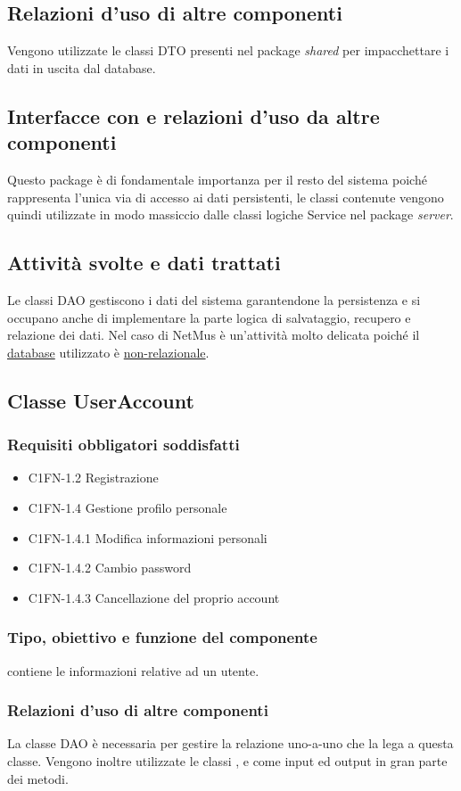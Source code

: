\subsection*{Relazioni d'uso di altre componenti}
Vengono utilizzate le classi DTO presenti nel package \emph{shared} per
impacchettare i dati in uscita dal database. 
\subsection*{Interfacce con e relazioni d'uso da altre componenti}
Questo package \`e di fondamentale importanza per il resto del sistema poich\'e
rappresenta l'unica via di accesso ai dati persistenti, le classi contenute
vengono quindi utilizzate in modo massiccio dalle classi logiche Service nel
package \emph{server}.
\subsection*{Attivit\`a svolte e dati trattati}
Le classi DAO gestiscono i dati del sistema garantendone la persistenza e si
occupano anche di implementare la parte logica di salvataggio, recupero e
relazione dei dati. Nel caso di NetMus \`e un'attivit\`a molto delicata poich\'e il
\underline{database} utilizzato \`e \underline{non-relazionale}.

\subsection{Classe UserAccount}
\subsubsection*{Requisiti obbligatori soddisfatti}
\begin{itemize}
	\item C1FN-1.2 Registrazione
	\item C1FN-1.4 Gestione profilo personale
	\item C1FN-1.4.1 Modifica informazioni personali
	\item C1FN-1.4.2 Cambio password
	\item C1FN-1.4.3 Cancellazione del proprio account
\end{itemize}
\subsubsection*{Tipo, obiettivo e funzione del componente}
 contiene le informazioni relative ad un utente.
\subsubsection*{Relazioni d'uso di altre componenti}
La classe DAO  \`e necessaria per gestire la relazione uno-a-uno
che la lega a questa classe. Vengono inoltre utilizzate le classi
,  e  come input ed
output in gran parte dei metodi. 
